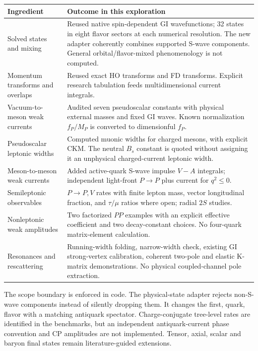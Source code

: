 \documentclass[11pt,a4paper]{article}
\begin{document}
\begin{longtable}{>{\raggedright\arraybackslash}p{.27\linewidth}>{\raggedright\arraybackslash}p{.65\linewidth}}
\toprule Ingredient & Outcome in this exploration \\\midrule
Solved states and mixing & Reused native spin-dependent GI wavefunctions; 32 states in eight flavor sectors at each numerical resolution. The new adapter coherently combines supported S-wave components. General orbital/flavor-mixed phenomenology is not computed.\\
Momentum transforms and overlaps & Reused exact HO transforms and FD transforms. Explicit research tabulation feeds multidimensional current integrals.\\
Vacuum-to-meson weak currents & Audited seven pseudoscalar constants with physical external masses and fixed GI waves. Known normalization $f_P/M_P$ is converted to dimensionful $f_P$.\\
Pseudoscalar leptonic widths & Computed muonic widths for charged mesons, with explicit CKM. The neutral $B_s$ constant is quoted without assigning it an unphysical charged-current leptonic width.\\
Meson-to-meson weak currents & Added active-quark S-wave impulse $V-A$ integrals; independent light-front $P\to P$ plus current for $q^2\leq0$.\\
Semileptonic observables & $P\to P,V$ rates with finite lepton mass, vector longitudinal fraction, and $\tau/\mu$ ratios where open; radial $2S$ studies.\\
Nonleptonic weak amplitudes & Two factorized $PP$ examples with an explicit effective coefficient and two decay-constant choices. No four-quark matrix-element calculation.\\
Resonances and rescattering & Running-width folding, narrow-width check, existing GI strong-vertex calibration, coherent two-pole and elastic K-matrix demonstrations. No physical coupled-channel pole extraction.\\
\bottomrule
\end{longtable}

The scope boundary is enforced in code. The physical-state adapter rejects non-S-wave components instead of silently dropping them. It changes the first, quark, flavor with a matching antiquark spectator. Charge-conjugate tree-level rates are identified in the benchmarks, but an independent antiquark-current phase convention and CP amplitudes are not implemented. Tensor, axial, scalar and baryon final states remain literature-guided extensions.
\end{document}
